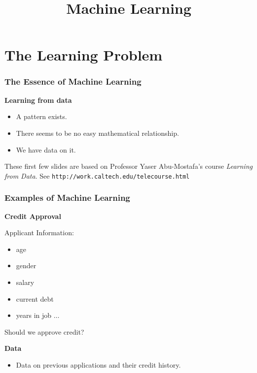 \documentclass[xcolor=table]{beamer}
\title{Machine Learning}
\begin{document}
\maketitle
\section{The Learning Problem}

\begin{frame}[t]
  \frametitle{The Essence of Machine Learning}  
\textbf{Learning from data}

  \begin{itemize}
    \item A pattern exists.
    \item There seems to be no easy mathematical relationship.
    \item We have data on it.
  \end{itemize}

\bigskip

\scriptsize{These first few slides are based on Professor Yaser 
Abu-Mostafa's course \emph{Learning from Data}. See 
\texttt{http://work.caltech.edu/telecourse.html}}
\end{frame}

\begin{frame}[t]
\frametitle{Examples of Machine Learning}
\textcolor{orange2}{\textbf{Credit Approval}}

Applicant Information:

\begin{itemize}
    \item age
    \item gender
    \item salary
    \item current debt
    \item years in job $\ldots$ 
\end{itemize}

\pause

Should we approve credit? 

\bigskip

\textbf{Data}
\begin{itemize}
    \item Data on previous applications and their credit history.
\end{itemize}
\end{frame}
\end{document}
